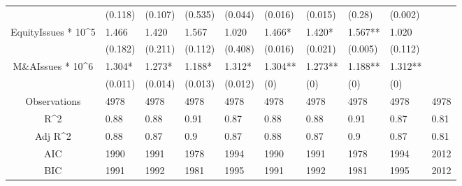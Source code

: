 \documentclass{article}
\begin{document}
\begin{table}[H]
\begin{tabular}{|clllllllll|}
   & (0.118) & (0.107) & (0.535) & (0.044) & (0.016) & (0.015) & (0.28) & (0.002) &  \\ 
  EquityIssues * 10^5 & 1.466 & 1.420 & 1.567 & 1.020 & 1.466* & 1.420* & 1.567** & 1.020 &  \\ 
   & (0.182) & (0.211) & (0.112) & (0.408) & (0.016) & (0.021) & (0.005) & (0.112) &  \\ 
  M\&AIssues * 10^6 & 1.304* & 1.273* & 1.188* & 1.312* & 1.304** & 1.273** & 1.188** & 1.312** &  \\ 
   & (0.011) & (0.014) & (0.013) & (0.012) & (0) & (0) & (0) & (0) &  \\ 
  \hline 
 Observations & 4978 & 4978 & 4978 & 4978 & 4978 & 4978 & 4978 & 4978 & 4978 \\ 
  R^2 & 0.88 & 0.88 & 0.91 & 0.87 & 0.88 & 0.88 & 0.91 & 0.87 & 0.81 \\ 
  Adj R^2 & 0.88 & 0.87 & 0.9 & 0.87 & 0.88 & 0.87 & 0.9 & 0.87 & 0.81 \\ 
  AIC & 1990 & 1991 & 1978 & 1994 & 1990 & 1991 & 1978 & 1994 & 2012 \\ 
  BIC & 1991 & 1992 & 1981 & 1995 & 1991 & 1992 & 1981 & 1995 & 2012 \\ 
   \hline
\end{tabular}
 
\end{table}
\end{document}
